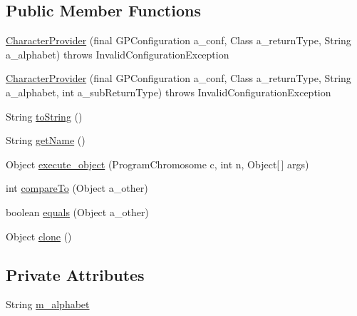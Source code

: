 \subsection*{Public Member Functions}
\begin{DoxyCompactItemize}
\item 
\hyperlink{classorg_1_1jgap_1_1gp_1_1function_1_1_character_provider_a0bfd35c148355477e68adf0fcd4333fb}{Character\-Provider} (final G\-P\-Configuration a\-\_\-conf, Class a\-\_\-return\-Type, String a\-\_\-alphabet)  throws Invalid\-Configuration\-Exception 
\item 
\hyperlink{classorg_1_1jgap_1_1gp_1_1function_1_1_character_provider_a0122fd25072169c2833505cdd68d5018}{Character\-Provider} (final G\-P\-Configuration a\-\_\-conf, Class a\-\_\-return\-Type, String a\-\_\-alphabet, int a\-\_\-sub\-Return\-Type)  throws Invalid\-Configuration\-Exception 
\item 
String \hyperlink{classorg_1_1jgap_1_1gp_1_1function_1_1_character_provider_a2ef83cebd50f6216a5c83b38f3f910b9}{to\-String} ()
\item 
String \hyperlink{classorg_1_1jgap_1_1gp_1_1function_1_1_character_provider_af30af2220974771a797076c7d3e2b644}{get\-Name} ()
\item 
Object \hyperlink{classorg_1_1jgap_1_1gp_1_1function_1_1_character_provider_a40c48ba4728a15ed38f9f466f8a90b62}{execute\-\_\-object} (Program\-Chromosome c, int n, Object\mbox{[}$\,$\mbox{]} args)
\item 
int \hyperlink{classorg_1_1jgap_1_1gp_1_1function_1_1_character_provider_ac480cb28253a5ca289a7350b93136ba8}{compare\-To} (Object a\-\_\-other)
\item 
boolean \hyperlink{classorg_1_1jgap_1_1gp_1_1function_1_1_character_provider_af492ade6411a9ad519857dcf28b07ddb}{equals} (Object a\-\_\-other)
\item 
Object \hyperlink{classorg_1_1jgap_1_1gp_1_1function_1_1_character_provider_a56e17a30324098c2693eee149e323382}{clone} ()
\end{DoxyCompactItemize}
\subsection*{Private Attributes}
\begin{DoxyCompactItemize}
\item 
String \hyperlink{classorg_1_1jgap_1_1gp_1_1function_1_1_character_provider_aeac5dd7525dfff4d0bcf89857cd53dd0}{m\-\_\-alphabet}
\end{DoxyCompactItemize}
